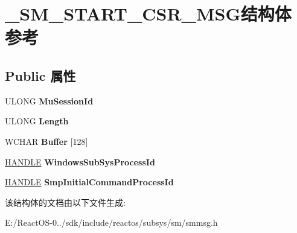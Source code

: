 \hypertarget{struct___s_m___s_t_a_r_t___c_s_r___m_s_g}{}\section{\+\_\+\+S\+M\+\_\+\+S\+T\+A\+R\+T\+\_\+\+C\+S\+R\+\_\+\+M\+S\+G结构体 参考}
\label{struct___s_m___s_t_a_r_t___c_s_r___m_s_g}
\subsection*{Public 属性}
\begin{DoxyCompactItemize}
\item 
\mbox{\label{struct___s_m___s_t_a_r_t___c_s_r___m_s_g_aff5a783d1180025c16f2c915b1b753df}} 
U\+L\+O\+NG {\bfseries Mu\+Session\+Id}
\item 
\mbox{\label{struct___s_m___s_t_a_r_t___c_s_r___m_s_g_a7906c48739365bcabc770be180ce1aed}} 
U\+L\+O\+NG {\bfseries Length}
\item 
\mbox{\label{struct___s_m___s_t_a_r_t___c_s_r___m_s_g_a052c0e8aed6e1b17f532dbe212a1f7c0}} 
W\+C\+H\+AR {\bfseries Buffer} \mbox{[}128\mbox{]}
\item 
\mbox{\label{struct___s_m___s_t_a_r_t___c_s_r___m_s_g_a3c74c69910e99069eeedbd85e5da7c63}} 
\hyperlink{interfacevoid}{H\+A\+N\+D\+LE} {\bfseries Windows\+Sub\+Sys\+Process\+Id}
\item 
\mbox{\label{struct___s_m___s_t_a_r_t___c_s_r___m_s_g_a1c538e01225f8ab4d41b1d762258a102}} 
\hyperlink{interfacevoid}{H\+A\+N\+D\+LE} {\bfseries Smp\+Initial\+Command\+Process\+Id}
\end{DoxyCompactItemize}


该结构体的文档由以下文件生成\+:\begin{DoxyCompactItemize}
\item 
E\+:/\+React\+O\+S-\/0../sdk/include/reactos/subsys/sm/smmsg.\+h\end{DoxyCompactItemize}
